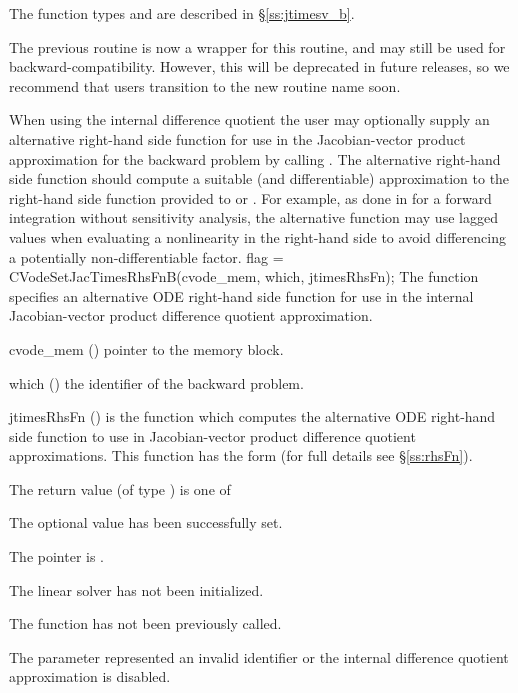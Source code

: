 {
  The function types  and
   are described in \S\ref{ss:jtimesv_b}.

  The previous routine  is now a wrapper for this
  routine, and may still be used for backward-compatibility.  However,
  this will be deprecated in future releases, so we recommend that
  users transition to the new routine name soon.
}
When using the internal difference quotient the user may optionally supply an
alternative right-hand side function for use in the Jacobian-vector product
approximation for the backward problem by calling .
The alternative right-hand side function should compute a suitable (and
differentiable) approximation to the right-hand side function provided to
 or . For example, as done in
\cite{dorr2010numerical} for a forward integration without sensitivity analysis,
the alternative function may use lagged values when evaluating a nonlinearity in
the right-hand side to avoid differencing a potentially non-differentiable
factor.
{
  flag = CVodeSetJacTimesRhsFnB(cvode\_mem, which, jtimesRhsFn);
}
{
  The function  specifies an alternative ODE
  right-hand side function for use in the internal Jacobian-vector product
  difference quotient approximation.
}
{
  \begin{args}[jtimesRhsFn]
  \item[cvode\_mem] ()
    pointer to the {\cvodes} memory block.
  \item[which] ()
    the identifier of the backward problem.
  \item[jtimesRhsFn] ()
    is the {\CC} function which computes the alternative ODE right-hand side
    function to use in Jacobian-vector product difference quotient
    approximations. This function has the form 
    (for full details see \S\ref{ss:rhsFn}).
  \end{args}
}
{
  The return value  (of type ) is one of
  \begin{args}
  \item[\Id{CVLS\_SUCCESS}]
    The optional value has been successfully set.
  \item[\Id{CVLS\_MEM\_NULL}]
    The  pointer is .
  \item[\Id{CVLS\_LMEM\_NULL}]
    The {\cvls} linear solver has not been initialized.
  \item[\Id{CVLS\_NO\_ADJ}]
    The function  has not been previously called.
  \item[\Id{CVLS\_ILL\_INPUT}]
    The parameter  represented an invalid identifier or the internal
    difference quotient approximation is disabled.
  \end{args}
}
